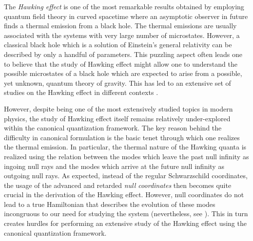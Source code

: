 \documentclass[aps,12pt,showpacs]{revtex4-2}
\begin{document}
The \emph{Hawking effect} \cite{hawking1975} is one of the most remarkable 
results obtained by employing quantum field theory in curved spacetime 
\cite{book:Birrell,book:Parker,book:Mukhanov} where an asymptotic observer in 
future finds a thermal emission from a black hole. The thermal emissions are 
usually associated with the systems with very large number of microstates. 
However, a classical black hole which is a solution of Einstein's  general 
relativity \cite{book:Schutz,book:carroll,book:wald,Fulling:1989nb} 
can be described by only a handful of parameters. This puzzling aspect often 
leads one to believe that the study of Hawking effect might allow one to 
understand the possible microstates of a black hole which are expected to arise 
from a possible, yet unknown, quantum theory of gravity. This has led to an 
extensive set of studies on the Hawking effect in different contexts 
\cite{Lambert:2013uaa, Jacobson:2003vx, Kiefer:2002fp, Traschen:1999zr, 
DEWITT1975295, Ford:1997hb, Hollands:2014eia,Padmanabhan:2009vy, 
Chakraborty:2015nwa,Chakraborty:2017pmn,Helfer:2003va,Carlip:2014pma,
Fulling1987135,Hinton:1982, Parikh:1999mf,Visser:2001kq, 
Singleton:2011vh,Bhattacharya:2013tq, Singh:2013pxf,Lapedes:1977ip, 
Davies:1974th, Wald1975,Singh:2014paa,Dray1985,Kawai:2013mda, 
Ho:2015fja,Jacobson:2012ei,PhysRevD.46.2486,Hartle:1976tp}.



However, despite being one of the most extensively studied topics in modern 
physics, the study of Hawking effect itself remains relatively under-explored 
within the canonical quantization framework. The key reason behind the
difficulty in canonical formulation is the basic tenet through which one 
realizes the thermal emission. In particular, the thermal nature of the Hawking 
quanta is realized using the relation between the modes which leave the past 
null infinity as ingoing null rays and the modes which arrive at the future 
null infinity as outgoing null rays. As expected, instead of the regular 
Schwarzschild coordinates, the usage of the advanced and retarded \emph{null 
coordinates} then becomes quite crucial in the derivation of the Hawking effect. 
However, null coordinates do not lead to a true Hamiltonian that describes the 
evolution of these modes incongruous to our need for studying the system 
(nevertheless, see 
\cite{Torre:1985rw,Dirac:1949cp,Harindranath:1996hq,dInverno:2006wzl}).
This in turn creates hurdles for performing an extensive study of the Hawking 
effect using the canonical quantization framework.
\end{document}
